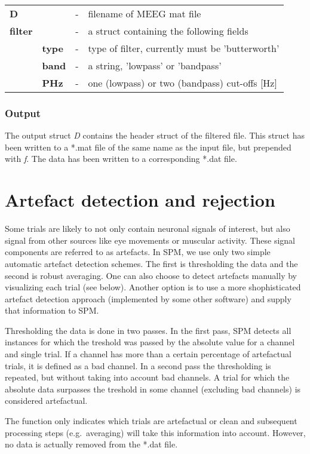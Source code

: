 \begin{tabular}{llcp{9cm}}
{\bf D} & & - & filename of MEEG mat file\\
{\bf filter}&  & - & a struct containing the following fields\\
& {\bf type} & - & type of filter, currently must be 'butterworth'\\
& {\bf band} & - & a string, 'lowpass' or 'bandpass' \\
& {\bf PHz} & - & one (lowpass) or two (bandpass) cut-offs [Hz]\\
\end{tabular}

\subsubsection{Output}
The output struct {\it D} contains the header struct of the filtered
file. This struct has been written to a *.mat file of the same name as
the input file, but prepended with {\it f}. The data has been
written to a corresponding *.dat file.


\section{Artefact detection and rejection}
Some trials are likely to not only contain neuronal signals of
interest, but also signal from other sources like eye movements or
muscular activity. These signal components are referred to as
artefacts. In SPM, we use only two simple automatic artefact detection
schemes. The first is thresholding the data and the second is robust
averaging. One can also choose to detect artefacts manually by
visualizing each trial (see below). Another option is to use a
more shophisticated artefact detection approach (implemented by some
other software) and supply that information to SPM. 

Thresholding the data is done in two passes. In the first pass, SPM
detects all instances for which the treshold was passed by the
absolute value for a channel and single trial. If a channel has more
than a certain percentage of artefactual trials, it is defined as a
bad channel. In a second pass the thresholding is repeated, but
without taking into account bad channels. A trial for which the
absolute data surpasses the treshold in some channel (excluding bad
channels) is considered artefactual.

The function only indicates which trials are artefactual or clean and
subsequent processing steps (e.g.~averaging) will take this
information into account. However, no data is actually removed from
the *.dat file.

